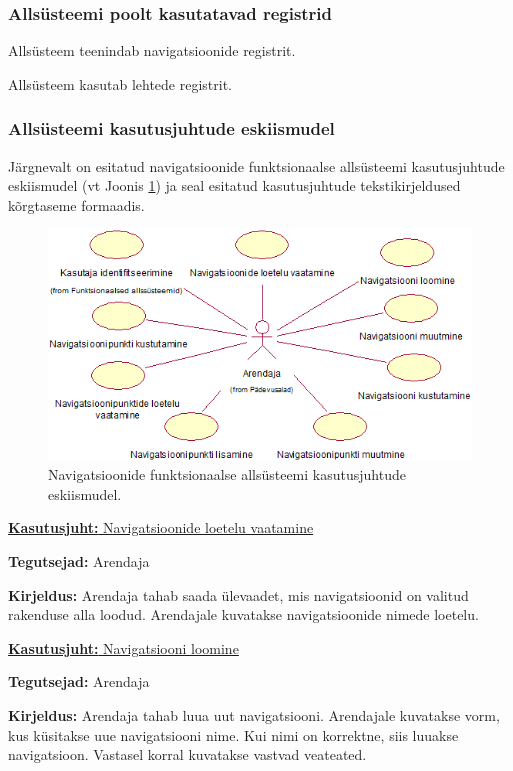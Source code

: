 \documentclass[a4paper,12pt]{article} %
\begin{document}
\subsubsection{Allsüsteemi poolt kasutatavad registrid}
Allsüsteem teenindab navigatsioonide registrit.\par
Allsüsteem kasutab lehtede registrit.
\subsubsection{Allsüsteemi kasutusjuhtude eskiismudel}
Järgnevalt on esitatud navigatsioonide funktsionaalse allsüsteemi kasutusjuhtude eskiismudel (vt Joonis \ref{fig_navigatsioonide_funktsionaalse_allsüsteemi_kasutusjuhtude_eskiismudel}) ja seal esitatud kasutusjuhtude tekstikirjeldused kõrgtaseme formaadis.
\begin{figure}[H]
\centering
\includegraphics[width=\textwidth]{./diagrams/navigations-subsystem-use-case-digram.png}
\caption{Navigatsioonide funktsionaalse allsüsteemi kasutusjuhtude eskiismudel.}
\label{fig_navigatsioonide_funktsionaalse_allsüsteemi_kasutusjuhtude_eskiismudel}
\end{figure}

\underline{\textbf{Kasutusjuht:} Navigatsioonide loetelu vaatamine}
\par
\textbf{Tegutsejad:} Arendaja
\par
\textbf{Kirjeldus:} Arendaja tahab saada ülevaadet, mis navigatsioonid on valitud rakenduse alla loodud. Arendajale kuvatakse navigatsioonide nimede loetelu.
\par

\underline{\textbf{Kasutusjuht:} Navigatsiooni loomine}
\par
\textbf{Tegutsejad:} Arendaja
\par
\textbf{Kirjeldus:} Arendaja tahab luua uut navigatsiooni. Arendajale kuvatakse vorm, kus küsitakse uue navigatsiooni nime. Kui nimi on korrektne, siis luuakse navigatsioon. Vastasel korral kuvatakse vastvad veateated.
\par
\end{document}
